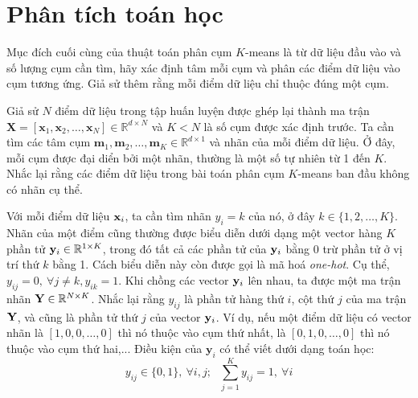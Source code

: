 


\section{Phân tích toán học }

Mục đích cuối cùng của thuật toán phân cụm $K$-means là từ dữ liệu đầu vào và số
lượng cụm cần tìm, hãy xác định tâm mỗi cụm và phân các điểm dữ liệu vào cụm
tương ứng. Giả sử thêm rằng mỗi điểm dữ liệu chỉ thuộc đúng một cụm.


Giả sử $N$ điểm dữ liệu trong tập huấn luyện được ghép lại thành ma trận $ \mathbf{X} =
[\mathbf{x}_1, \mathbf{x}_2, \dots,
\mathbf{x}_N] \in \mathbb{R}^{d \times N}$ và $K < N$ là số cụm được xác định trước. Ta cần tìm các tâm cụm $ \mathbf{m}_1, \mathbf{m}_2,
\dots, \mathbf{m}_K \in \mathbb{R}^{d \times 1}$ và nhãn của mỗi điểm dữ liệu.
Ở đây, mỗi cụm được đại diển bởi một nhãn, thường là một số tự nhiên từ 1
đến $K$. Nhắc lại rằng các điểm dữ liệu trong bài toán phân cụm $K$-means ban
đầu không có nhãn cụ thể.

Với mỗi điểm dữ liệu $\mathbf{x}_i$, ta cần tìm nhãn $y_i = k$ của nó, ở đây $k\in
\{1, 2, \dots, K\}$. Nhãn của một điểm cũng thường được biểu diễn dưới dạng một
vector hàng $K$ phần tử $\mathbf{y}_i \in \mathbb{R}^{1\times K}$, trong đó tất cả các phần tử
của $\mathbf{y}_i$ bằng 0 trừ phần tử ở vị trí thứ $k$ bằng 1. Cách biểu diễn này còn
được gọi là mã hoá \textit{one-hot}. Cụ thể, $y_{ij} = 0,~\forall j \neq k,
y_{ik} = 1$. Khi {chồng} các vector $\mathbf{y}_i$ lên nhau, ta được một ma trận nhãn
$\mathbf{Y} \in \mathbb{R}^{N\times K}$. Nhắc lại rằng $y_{ij}$ là phần tử hàng thứ $i$, cột
thứ $j$ của ma trận $\mathbf{Y}$, và cũng là phần tử thứ $j$ của vector $\mathbf{y}_i$. Ví dụ,
nếu một điểm dữ liệu có vector nhãn là $[1,0,0,\dots,0]$ thì nó thuộc vào cụm
thứ nhất, là $[0,1,0,\dots,0]$ thì nó thuộc vào cụm thứ hai,... Điều kiện của
$\mathbf{y}_i $ có thể viết dưới dạng toán học:
\begin{equation}
\label{eqn:4_1} y_{ij} \in \{0, 1\},~\forall i, j;~~~ \sum_{j = 1}^K y_{ij} = 1, ~\forall i
\end{equation}

